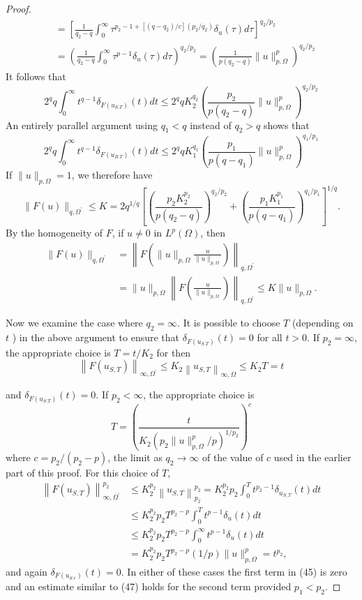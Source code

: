 \begin{proof}
\[\begin{aligned}
  & =\left[\frac{1}{q_2-q} \int_0^{\infty} \tau^{p_2-1+\left[\left(q-q_2\right) / c\right]\left(p_2 / q_2\right)} \delta_u(\tau) d \tau\right]^{q_2 / p_2} \\
  & =\left(\frac{1}{q_2-q} \int_0^{\infty} \tau^{p-1} \delta_u(\tau) d \tau\right)^{q_2 / p_2}=\left(\frac{1}{p\left(q_2-q\right)}\|u\|_{p, \Omega}^p\right)^{q_2 / p_2}
  \end{aligned}
  \]
  It follows that
  \[
  2^q q \int_0^{\infty} t^{q-1} \delta_{F\left(u_{S . T}\right)}(t) d t \leq 2^q q K_2^{q_2}\left(\frac{p_2}{p\left(q_2-q\right)}\|u\|_{p, \Omega}^p\right)^{q_2 / p_2}
  \]
  An entirely parallel argument using $q_1<q$ instead of $q_2>q$ shows that
  \[
  2^q q \int_0^{\infty} t^{q-1} \delta_{F\left(u_{B . T}\right)}(t) d t \leq 2^q q K_1^{q_1}\left(\frac{p_1}{p\left(q-q_1\right)}\|u\|_{p, \Omega}^p\right)^{q_1 / p_1}
  \]
  If $\|u\|_{p, \Omega}=1$, we therefore have
  \[
  \|F(u)\|_{q, \Omega^{\prime}} \leq K=2 q^{1 / q}\left[\left(\frac{p_2 K_2^{p_2}}{p\left(q_2-q\right)}\right)^{q_2 / p_2}+\left(\frac{p_1 K_1^{p_1}}{p\left(q-q_1\right)}\right)^{q_1 / p_1}\right]^{1 / q} .
  \]
  By the homogeneity of $F$, if $u \neq 0$ in $L^p(\Omega)$, then
  \[
  \begin{aligned}
  \|F(u)\|_{q, \Omega^{\prime}} & =\left\|F\left(\|u\|_{p, \Omega} \frac{u}{\|u\|_{p, \Omega}}\right)\right\|_{q, \Omega^{\prime}} \\
  & =\|u\|_{p, \Omega}\left\|F\left(\frac{u}{\|u\|_{p, \Omega}}\right)\right\|_{q, \Omega^{\prime}} \leq K\|u\|_{p, \Omega} .
  \end{aligned}
  \]
  
  Now we examine the case where $q_2=\infty$. It is possible to choose $T$ (depending on $t$ ) in the above argument to ensure that $\delta_{F\left(u_{S . T}\right)}(t)=0$ for all $t>0$. If $p_2=\infty$, the appropriate choice is $T=t / K_2$ for then
  \[
  \left\|F\left(u_{S, T}\right)\right\|_{\infty, \Omega^{\prime}} \leq K_2\left\|u_{S, T}\right\|_{\infty, \Omega} \leq K_2 T=t
  \]
  
  and $\delta_{F\left(u_{S . T}\right)}(t)=0$. If $p_2<\infty$, the appropriate choice is
  \[
  T=\left(\frac{t}{K_2\left(p_2\|u\|_{p, \Omega}^p / p\right)^{1 / p_2}}\right)^c
  \]
  where $c=p_2 /\left(p_2-p\right)$, the limit as $q_2 \rightarrow \infty$ of the value of $c$ used in the earlier part of this proof. For this choice of $T$,
  \[
  \begin{aligned}
  \left\|F\left(u_{S, T}\right)\right\|_{\infty, \Omega^{\prime}}^{p_2} & \leq K_2^{p_2}\left\|u_{S, T}\right\|_{p_2}^{p_2}=K_2^{p_2} p_2 \int_0^T t^{p_2-1} \delta_{u_{S, T}}(t) d t \\
  & \leq K_2^{p_2} p_2 T^{p_2-p} \int_0^T t^{p-1} \delta_u(t) d t \\
  & \leq K_2^{p_2} p_2 T^{p_2-p} \int_0^{\infty} t^{p-1} \delta_u(t) d t \\
  & =K_2^{p_2} p_2 T^{p_2-p}(1 / p)\|u\|_{p, \Omega}^p=t^{p_2},
  \end{aligned}
  \]
  and again $\delta_{F\left(u_{S . r}\right)}(t)=0$. In either of these cases the first term in (45) is zero and an estimate similar to (47) holds for the second term provided $p_1<p_2$.
  

\end{proof}
